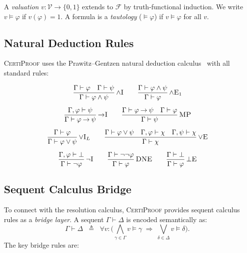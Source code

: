 \documentclass[acmtocl,review,anonymous]{acmart}
\newcommand{\entails}{\vDash}
\newcommand{\proves}{\vdash}
\newcommand{\dland}{\mathbin{\wedge}}
\newcommand{\dlor}{\mathbin{\vee}}
\newcommand{\dlnot}{\neg}
\newcommand{\dlimp}{\mathbin{\to}}
\newcommand{\dlbot}{\bot}
\newcommand{\Fml}{\mathcal{F}}
\newcommand{\CP}{\textsc{CertiProof}}
\newcommand{\infrule}[3]{
  \dfrac{\displaystyle #2}{\displaystyle #3}\,\textsc{#1}
}
\begin{document}
A \emph{valuation} $v : \mathcal{V} \to \{0,1\}$ extends to $\Fml$
by truth-functional induction.  We write $v \entails \varphi$ if
$v(\varphi) = 1$.  A formula is a \emph{tautology} ($\entails \varphi$)
if $v \entails \varphi$ for all $v$.

\subsection{Natural Deduction Rules}

\CP{} uses the Prawitz--Gentzen natural deduction
calculus~\cite{Prawitz1965,Gentzen1969} with all standard rules:

\medskip
\begin{gather}
  \infrule{$\wedge$I}
    {\Gamma \proves \varphi \quad \Gamma \proves \psi}
    {\Gamma \proves \varphi \dland \psi}
  \qquad
  \infrule{$\wedge$E$_1$}
    {\Gamma \proves \varphi \dland \psi}
    {\Gamma \proves \varphi}
  \label{eq:and-rules}
  \\[6pt]
  \infrule{$\to$I}
    {\Gamma, \varphi \proves \psi}
    {\Gamma \proves \varphi \dlimp \psi}
  \qquad
  \infrule{MP}
    {\Gamma \proves \varphi \dlimp \psi \quad \Gamma \proves \varphi}
    {\Gamma \proves \psi}
  \label{eq:imp-rules}
  \\[6pt]
  \infrule{$\vee$I$_L$}
    {\Gamma \proves \varphi}
    {\Gamma \proves \varphi \dlor \psi}
  \qquad
  \infrule{$\vee$E}
    {\Gamma \proves \varphi \dlor \psi \quad
     \Gamma, \varphi \proves \chi \quad
     \Gamma, \psi \proves \chi}
    {\Gamma \proves \chi}
  \label{eq:or-rules}
  \\[6pt]
  \infrule{$\dlnot$I}
    {\Gamma, \varphi \proves \dlbot}
    {\Gamma \proves \dlnot\varphi}
  \qquad
  \infrule{DNE}
    {\Gamma \proves \dlnot\dlnot\varphi}
    {\Gamma \proves \varphi}
  \qquad
  \infrule{$\dlbot$E}
    {\Gamma \proves \dlbot}
    {\Gamma \proves \varphi}
  \label{eq:not-rules}
\end{gather}

\subsection{Sequent Calculus Bridge}

To connect with the resolution calculus, \CP{} provides sequent
calculus rules as a \emph{bridge layer}.  A sequent
$\Gamma \proves \Delta$ is encoded semantically as:
\begin{equation}
  \Gamma \proves \Delta \;\;\triangleq\;\;
  \forall v:\bigl(\textstyle\bigwedge_{\gamma \in \Gamma}
    v \entails \gamma \;\Rightarrow\;
    \textstyle\bigvee_{\delta \in \Delta} v \entails \delta\bigr).
\end{equation}
The key bridge rules are:
\end{document}
